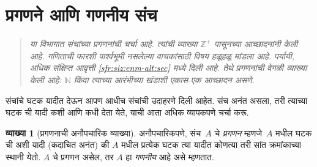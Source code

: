 \documentclass[11pt,a4paper,openany]{book}
\theoremstyle{definition}
\newtheorem{defn}{व्याख्या}[section]
\newenvironment{explain}{}{}
\newcommand{\Nat}{\mathbb{N}}
\newcommand{\PosInt}{\mathbb{Z}^{+}}
\newenvironment{editorial}{\begin{quote}\small\itshape}{\end{quote}}
\begin{document}
\section{प्रगणने आणि गणनीय संच}\label{sfr:siz:enm:sec}

\begin{editorial}
  या विभागात संचांच्या प्रगणनांची चर्चा आहे. त्यांची व्याख्या
  $\PosInt$ पासूनच्या आच्छादनांनी केली आहे. गणिताची फारशी पार्श्वभूमी
  नसलेल्या वाचकांसाठी विषय हळूहळू मांडला आहे. पर्यायी, अधिक संक्षिप्त
  आवृत्ती \ref{sfr:siz:enm-alt:sec} मध्ये दिली आहे. तेथे प्रगणनांची वेगळी
  व्याख्या केली आहे: $\Nat$ किंवा त्याच्या आरंभीच्या खंडाशी
  एकास-एक आच्छादन असणे.
\end{editorial}

\begin{explain}
संचांचे घटक यादीत देऊन आपण आधीच संचांची उदाहरणे दिली आहेत.
संच अनंत असला, तरी त्याच्या घटक ची यादी कशी आणि कधी
देता येते, याची आता अधिक व्यापकपणे चर्चा करू.
\end{explain}

\begin{defn}[प्रगणनाची अनौपचारिक व्याख्या]
अनौपचारिकपणे, संच~$A$ चे \emph{प्रगणन} म्हणजे~$A$ मधील
घटक ची अशी यादी (कदाचित अनंत) की $A$ मधील प्रत्येक
घटक त्या यादीत कोणत्या तरी सांत क्रमांकाच्या स्थानी येतो.
$A$ चे प्रगणन असेल, तर $A$ हा \emph{गणनीय} आहे असे म्हणतात.
\end{defn}
\end{document}
